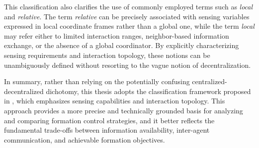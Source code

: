 This classification also clarifies the use of commonly employed terms such as \emph{local} and \emph{relative}. The term \emph{relative} can be precisely associated with sensing variables expressed in local coordinate frames rather than a global one, while the term \emph{local} may refer either to limited interaction ranges, neighbor-based information exchange, or the absence of a global coordinator. By explicitly characterizing sensing requirements and interaction topology, these notions can be unambiguously defined without resorting to the vague notion of decentralization.

In summary, rather than relying on the potentially confusing centralized-decentralized dichotomy, this thesis adopts the classification framework proposed in \cite{Oh2015}, which emphasizes sensing capabilities and interaction topology. This approach provides a more precise and technically grounded basis for analyzing and comparing formation control strategies, and it better reflects the fundamental trade-offs between information availability, inter-agent communication, and achievable formation objectives.

